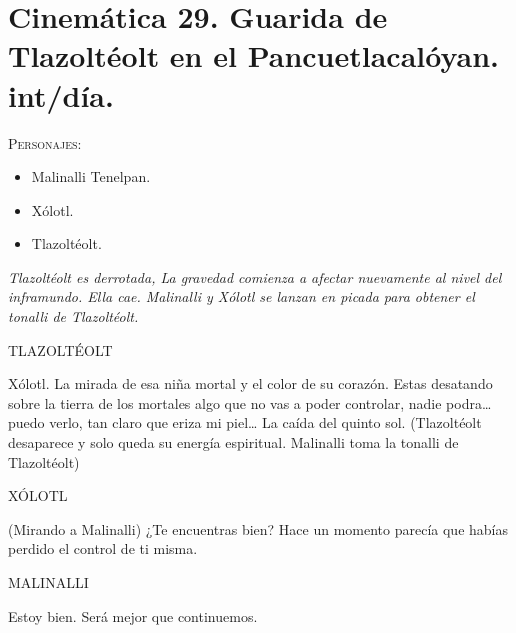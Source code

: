 \documentclass[11pt,letterpaper]{article}
\begin{document}
\section{Cinemática 29. Guarida de Tlazoltéolt en el Pancuetlacalóyan. int/día.}
 \textsc{Personajes}:
 \begin{itemize}
 \item Malinalli Tenelpan.
\item Xólotl.
\item Tlazoltéolt.
 \end{itemize}
\textit{Tlazoltéolt es derrotada, La gravedad comienza a afectar nuevamente al nivel del inframundo. Ella cae. Malinalli y Xólotl se lanzan en picada para obtener el tonalli de Tlazoltéolt.}
\begin{center}
TLAZOLTÉOLT
\\
\par
Xólotl. La mirada de esa niña mortal y el color de su corazón. Estas desatando sobre la tierra de los mortales algo que no vas a poder controlar, nadie podra… puedo verlo, tan claro que eriza mi piel… La caída del quinto sol. (Tlazoltéolt desaparece y solo queda su energía espiritual. Malinalli toma la tonalli de Tlazoltéolt) 
\\
\par
XÓLOTL
\\
\par
(Mirando a Malinalli) ¿Te encuentras bien? Hace un momento parecía que habías perdido el control de ti misma.
\\
\par
MALINALLI
\\
\par
Estoy bien. Será mejor que continuemos.
\end{center}
\end{document}
